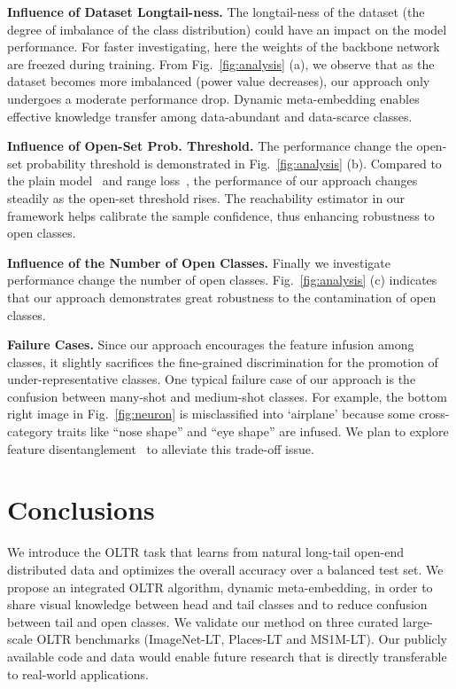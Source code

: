 \documentclass[10pt,twocolumn,letterpaper]{article}
\begin{document}
\vspace{2pt}
\noindent
\textbf{Influence of Dataset Longtail-ness.}
The longtail-ness of the dataset (\eg the degree of imbalance of the class distribution) could have an impact on the model performance. 
For faster investigating, here the weights of the backbone network are freezed during training.
From Fig.~\ref{fig:analysis} (a), we observe that as the dataset becomes more imbalanced (\ie power value  decreases), our approach only undergoes a moderate performance drop.
Dynamic meta-embedding enables effective knowledge transfer among data-abundant and data-scarce classes.

\vspace{2pt}
\noindent
\textbf{Influence of Open-Set Prob. Threshold.}
The performance change \wrt the open-set probability threshold is demonstrated in Fig.~\ref{fig:analysis} (b).
Compared to the plain model~\cite{he2016deep} and range loss~\cite{zhang2017range}, the performance of our approach changes steadily as the open-set threshold rises.
The reachability estimator in our framework helps calibrate the sample confidence, thus enhancing robustness to open classes.

\vspace{2pt}
\noindent
\textbf{Influence of the Number of Open Classes.}
Finally we investigate performance change \wrt the number of open classes.
Fig.~\ref{fig:analysis} (c) indicates that our approach demonstrates great robustness to the contamination of open classes.

\vspace{2pt}
\noindent
\textbf{Failure Cases.}
Since our approach encourages the feature infusion among classes, it slightly sacrifices the fine-grained discrimination for the promotion of under-representative classes. 
One typical failure case of our approach is the confusion between many-shot and medium-shot classes.
For example, the bottom right image in Fig.~\ref{fig:neuron} is misclassified into `airplane' because some cross-category traits like ``nose shape'' and ``eye shape'' are infused.
We plan to explore feature disentanglement~\cite{bengio2013representation} to alleviate this trade-off issue.


 \section{Conclusions}

We introduce the OLTR task that learns from natural long-tail open-end distributed data and optimizes the overall accuracy over a balanced test set.
We propose an integrated OLTR algorithm, dynamic meta-embedding,
in order to share visual knowledge between head and tail classes and  to reduce confusion between tail and open classes.
We validate our method on three curated large-scale OLTR benchmarks (ImageNet-LT, Places-LT and MS1M-LT).  Our publicly available code and data would enable future research that is directly transferable to real-world applications.
\end{document}
